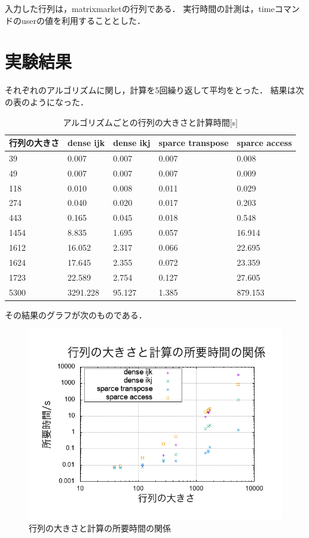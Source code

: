 \documentclass[11pt,a4paper]{jsarticle}
\begin{document}
入力した行列は，matrixmarketの行列である．
実行時間の計測は，timeコマンドのuserの値を利用することとした．


\section{実験結果}

それぞれのアルゴリズムに関し，計算を5回繰り返して平均をとった．
結果は次の表のようになった．

\begin{table}[H]
\begin{center}
\caption{アルゴリズムごとの行列の大きさと計算時間[s]}
\begin{tabular}{lllll}
\hline
行列の大きさ& dense ijk & dense ikj & sparce transpose & sparce access \\ \hline 
39&0.007&0.007&0.007&0.008\\
49&0.007&0.007&0.007&0.009\\
118&0.010&0.008&0.011&0.029\\
274&0.040&0.020&0.017&0.203\\
443&0.165&0.045&0.018&0.548\\
1454&8.835&1.695&0.057&16.914\\
1612&16.052&2.317&0.066&22.695\\
1624&17.645&2.355&0.072&23.359\\
1723&22.589&2.754&0.127&27.605\\
5300&3291.228&95.127&1.385&879.153\\ \hline
\end{tabular}
\end{center}
\end{table}


その結果のグラフが次のものである．

\begin{figure}[H]
  \begin{center}
  \includegraphics[width=14cm]{../graph.png}
  \caption{行列の大きさと計算の所要時間の関係}
  \end{center}
\end{figure}
\end{document}
